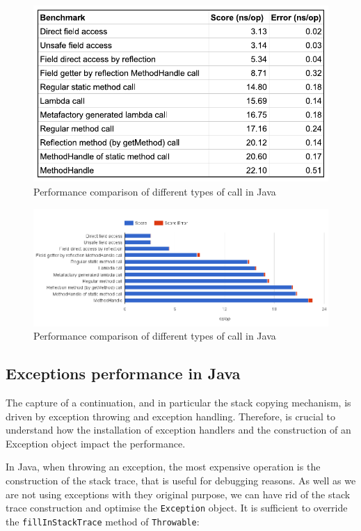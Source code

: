 \documentclass[12pt,a4paper,oneside,openright]{book}
\begin{document}
\begin{figure}[htbp]
\centering
\includegraphics{figures/calls-table.pdf}
\caption{Performance comparison of different types of call in Java
\label{calls-table}}
\end{figure}

\begin{figure}[htbp]
\centering
\includegraphics{figures/calls.png}
\caption{Performance comparison of different types of call in Java
\label{calls}}
\end{figure}

\subsection{Exceptions performance in
Java}\label{exceptions-performance-in-java}

The capture of a continuation, and in particular the stack copying
mechanism, is driven by exception throwing and exception handling.
Therefore, is crucial to understand how the installation of exception
handlers and the construction of an Exception object impact the
performance.

In Java, when throwing an exception, the most expensive operation is the
construction of the stack trace, that is useful for debugging reasons.
As well as we are not using exceptions with they original purpose, we
can have rid of the stack trace construction and optimise the
\texttt{Exception} object. It is sufficient to override the
\texttt{fillInStackTrace} method of \texttt{Throwable}:
\end{document}
